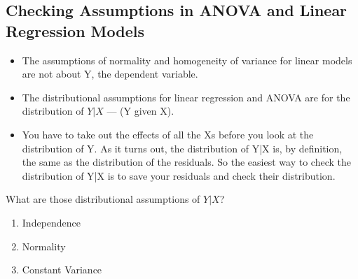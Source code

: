 \documentclass[residuals.tex]{subfiles}
\begin{document}
	
	\Large
	
	
	
\subsection{Checking Assumptions in ANOVA and Linear Regression Models}
%
\begin{itemize}
\item The assumptions of normality and homogeneity of variance for linear models are not about Y, the dependent variable.  


\item The distributional assumptions for linear regression and ANOVA are for the distribution of $Y|X$ — (Y given X).  

\item You have to take out the effects of all the Xs before you look at the distribution of Y.  As it turns out, the distribution of Y|X is, by definition, the same as the distribution of the residuals.  So the easiest way to check the distribution of Y|X is to save your residuals and check their distribution.



%
\end{itemize}
\newpage
What are those distributional assumptions of $Y|X$?


\begin{enumerate}
\item Independence

\item Normality

\item Constant Variance

\end{enumerate}
\end{document}

